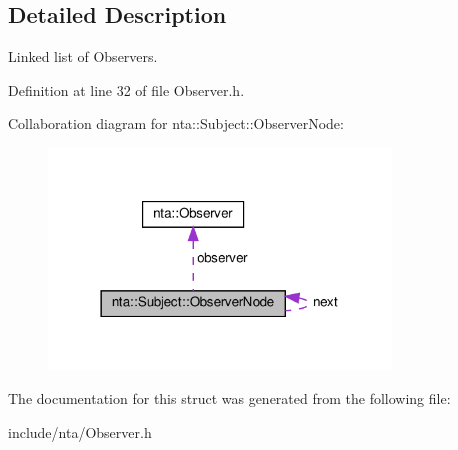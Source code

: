 \subsection{Detailed Description}
Linked list of Observers. 

Definition at line 32 of file Observer.\+h.



Collaboration diagram for nta\+:\+:Subject\+:\+:Observer\+Node\+:\nopagebreak
\begin{figure}[H]
\begin{center}
\leavevmode
\includegraphics[width=258pt]{dd/dbe/structnta_1_1Subject_1_1ObserverNode__coll__graph}
\end{center}
\end{figure}


The documentation for this struct was generated from the following file\+:\begin{DoxyCompactItemize}
\item 
include/nta/Observer.\+h\end{DoxyCompactItemize}
